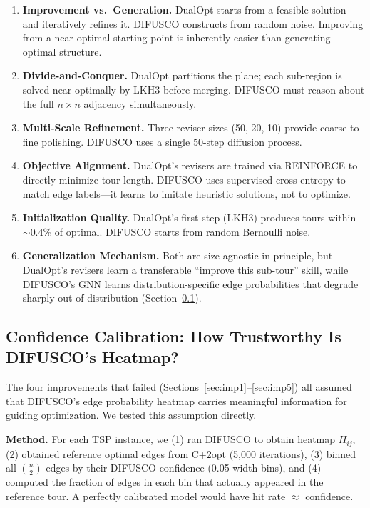\documentclass[11pt,a4paper]{article}
\begin{document}
\begin{enumerate}[nosep]
\item \textbf{Improvement vs.\ Generation.} DualOpt starts from a feasible solution and iteratively refines it. DIFUSCO constructs from random noise. Improving from a near-optimal starting point is inherently easier than generating optimal structure.
\item \textbf{Divide-and-Conquer.} DualOpt partitions the plane; each sub-region is solved near-optimally by LKH3 before merging. DIFUSCO must reason about the full $n \times n$ adjacency simultaneously.
\item \textbf{Multi-Scale Refinement.} Three reviser sizes (50, 20, 10) provide coarse-to-fine polishing. DIFUSCO uses a single 50-step diffusion process.
\item \textbf{Objective Alignment.} DualOpt's revisers are trained via REINFORCE to directly minimize tour length. DIFUSCO uses supervised cross-entropy to match edge labels---it learns to imitate heuristic solutions, not to optimize.
\item \textbf{Initialization Quality.} DualOpt's first step (LKH3) produces tours within $\sim$0.4\% of optimal. DIFUSCO starts from random Bernoulli noise.
\item \textbf{Generalization Mechanism.} Both are size-agnostic in principle, but DualOpt's revisers learn a transferable ``improve this sub-tour'' skill, while DIFUSCO's GNN learns distribution-specific edge probabilities that degrade sharply out-of-distribution (Section~\ref{sec:calibration}).
\end{enumerate}

\subsection{Confidence Calibration: How Trustworthy Is DIFUSCO's Heatmap?}
\label{sec:calibration}

The four improvements that failed (Sections~\ref{sec:imp1}--\ref{sec:imp5}) all assumed that DIFUSCO's edge probability heatmap carries meaningful information for guiding optimization. We tested this assumption directly.

\textbf{Method.} For each TSP instance, we (1) ran DIFUSCO to obtain heatmap $H_{ij}$, (2) obtained reference optimal edges from C+2opt (5,000 iterations), (3) binned all $\binom{n}{2}$ edges by their DIFUSCO confidence (0.05-width bins), and (4) computed the fraction of edges in each bin that actually appeared in the reference tour. A perfectly calibrated model would have hit rate $\approx$ confidence.
\end{document}
